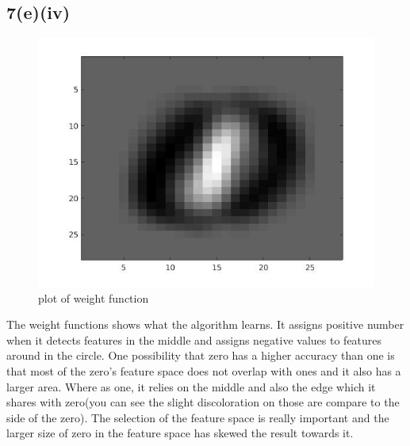 \subsection*{7(e)(iv)}
\begin{figure}[H]
\centering
\includegraphics[width=6.5in]{figures/q7-6.jpg}
\caption{plot of weight function}
\end{figure}
The weight functions shows what the algorithm learns. It assigns positive number when it detects features in the middle and assigns negative values to features around in the circle. One possibility that zero has a higher accuracy than one is that most of the zero's feature space does not overlap with ones and it also has a larger area. Where as one, it relies on the middle and also the edge which it shares with zero(you can see the slight discoloration on those are compare to the side of the zero). The selection of the feature space is really important and the larger size of zero in the feature space has skewed the result towards it.
